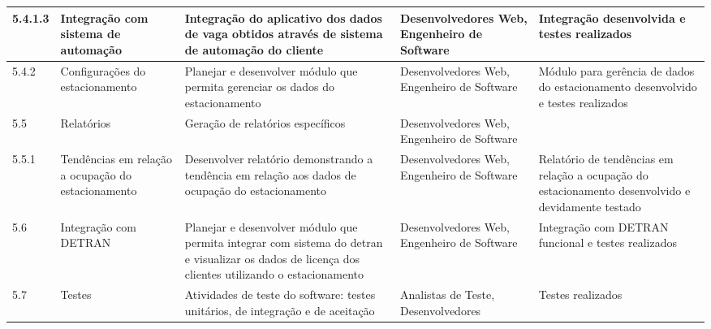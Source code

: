 \begin{landscape}
\begin{longtable}{@{\extracolsep{\fill}}  l  p{}  p{}  p{}  p{}  }
		\midrule
		5.4.1.3                & Integração com sistema de automação                  & Integração do aplicativo dos dados de vaga obtidos através de sistema de automação do cliente                                                                               & Desenvolvedores Web, Engenheiro de Software                                                      & Integração desenvolvida e testes realizados                                                            \\*
		\midrule
		5.4.2                  & Configurações do estacionamento                        & Planejar e desenvolver módulo que permita gerenciar os dados do estacionamento                                                                                                  & Desenvolvedores Web, Engenheiro de Software                                                      & Módulo para gerência de dados do estacionamento desenvolvido e testes realizados                       \\*
		\midrule
		5.5                    & Relatórios                                              & Geração de relatórios específicos                                                                                                                                            & Desenvolvedores Web, Engenheiro de Software                                                      &                                                                                                          \\*
		\midrule
		5.5.1                  & Tendências em relação a ocupação do estacionamento  & Desenvolver relatório demonstrando a tendência em relação aos dados de ocupação do estacionamento                                                                          & Desenvolvedores Web, Engenheiro de Software                                                      & Relatório de tendências em relação a ocupação do estacionamento desenvolvido e devidamente testado \\*
		\midrule
		5.6                    & Integração com DETRAN                                  & Planejar e desenvolver módulo que permita integrar com sistema do detran e visualizar os dados de licença dos clientes utilizando o estacionamento                             & Desenvolvedores Web, Engenheiro de Software                                                      & Integração com DETRAN funcional e testes realizados                                                    \\*
		\midrule
		5.7                    & Testes                                                   & Atividades de teste do software: testes unitários, de integração e de aceitação                                                                                                            & Analistas de Teste, Desenvolvedores                                                              & Testes realizados                                                                                        \\*

\end{longtable}
\end{landscape}
